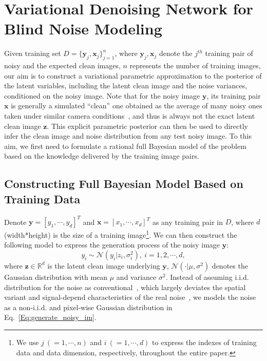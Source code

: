 \documentclass{article}
\begin{document}
\vspace{-2mm}\section{Variational Denoising Network for Blind Noise Modeling}\vspace{-2mm}
Given training set $D=\{\bm{y}_j,\bm{x}_j\}_{j=1}^n$, where $\bm{y}_j,\bm{x}_j$ denote the $j^{th}$ training
pair of noisy and the expected clean images, $n$ represents the number of training images,
 our aim is to construct a variational parametric
approximation to the posterior of the latent variables, including the latent clean image and the noise variances,
conditioned on the noisy image. Note that for the noisy image $\bm{y}$, its training pair $\bm{x}$ is
generally a simulated ``clean'' one obtained as the average of many noisy ones taken under similar camera
conditions~\cite{anaya2014renoir,Abdelhamed_2018_CVPR}, and thus is always not the exact latent clean image $\bm{z}$.
This explicit parametric posterior can then be used to directly infer the clean image and noise
distribution from any test noisy image. To this aim, we first need to formulate a rational full Bayesian
model of the problem based on the knowledge delivered by the training image pairs.

\vspace{-2mm}\subsection{Constructing Full Bayesian Model Based on Training Data}\vspace{-2mm}
Denote $\bm{y}=[y_1,\cdots,y_d]^T$ and $\bm{x}=[x_1,\cdots,x_d]^T$ as any training pair in $D$,
where $d$ (width*height) is the size of a training image\footnote{We use $j~(=1,\cdots,n)$ and
$i~(=1,\cdots,d)$ to express the indexes of training data and data dimension, respectively, throughout
the entire paper.}. We can then construct the following model to express the generation process
of the noisy image $\bm{y}$:
\begin{equation}
    y_i \sim \mathcal{N}(y_i|z_i, \sigma_i^2),~ i=1,2,\cdots,d,
    \label{Eq:generate_noisy_im}
\end{equation}
where $\bm{z} \in \mathbb{R}^d$ is the latent clean image underlying $\bm{y}$, $\mathcal{N}(\cdot | \mu, \sigma^2)$ denotes
the Gaussian distribution with mean $\mu$ and variance $\sigma^2$.
Instead of assuming i.i.d. distribution for the noise as
conventional~\cite{mairal2008sparse,dong2013nonlocal,gu2014weighted,Xu_2018_ECCV}, which largely deviates the
spatial variant and signal-depend characteristics of the real noise~\cite{zhang2018ffdnet,brooks2018unprocessing},
we models the noise as a non-i.i.d. and pixel-wise Gaussian distribution in Eq.~\eqref{Eq:generate_noisy_im}.
\end{document}
